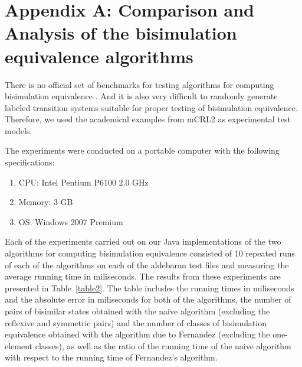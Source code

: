 \section*{Appendix A: Comparison and Analysis of the bisimulation equivalence algorithms}
\label{appendixA}

There is no official set of benchmarks for testing algorithms for computing bisimulation equivalence \cite{PiazzaPolicriti}. And it is also very difficult to randomly generate labeled transition systems suitable for proper testing of bisimulation equivalence. Therefore, we used the academical examples from mCRL2 as experimental test models. 

The experiments were conducted on a portable computer with the following specifications: 
\begin{enumerate}
	\item CPU: Intel Pentium P6100 2.0 GHz
	\item Memory: 3 GB
	\item OS: Windows 2007 Premium
\end{enumerate}

Each of the experiments carried out on our Java implementations of the two algorithms for computing bisimulation equivalence consisted of 10 repeated runs of each of the algorithms on each of the aldebaran test files and measuring the average running time in miliseconds. 
The results from these experiments are presented in Table~\ref{table2}. The table includes the running times in miliseconds and the absolute error in miliseconds for both of the algorithms, the number of pairs of bisimilar states obtained with the naive algorithm (excluding the reflexive and symmetric pairs) and the number of classes of bisimulation equivalence obtained with the algorithm due to Fernandez (excluding the one-element classes), as well as the ratio of the running time of the naive algorithm with respect to the running time of Fernandez's algorithm.

